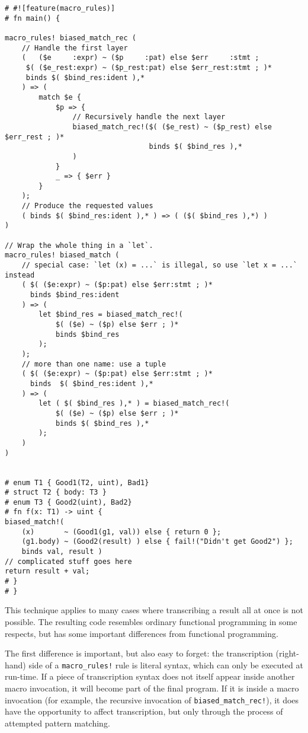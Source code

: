 \documentclass[]{article}
\begin{document}
\begin{verbatim}
# #![feature(macro_rules)]
# fn main() {

macro_rules! biased_match_rec (
    // Handle the first layer
    (   ($e     :expr) ~ ($p     :pat) else $err     :stmt ;
     $( ($e_rest:expr) ~ ($p_rest:pat) else $err_rest:stmt ; )*
     binds $( $bind_res:ident ),*
    ) => (
        match $e {
            $p => {
                // Recursively handle the next layer
                biased_match_rec!($( ($e_rest) ~ ($p_rest) else $err_rest ; )*
                                  binds $( $bind_res ),*
                )
            }
            _ => { $err }
        }
    );
    // Produce the requested values
    ( binds $( $bind_res:ident ),* ) => ( ($( $bind_res ),*) )
)

// Wrap the whole thing in a `let`.
macro_rules! biased_match (
    // special case: `let (x) = ...` is illegal, so use `let x = ...` instead
    ( $( ($e:expr) ~ ($p:pat) else $err:stmt ; )*
      binds $bind_res:ident
    ) => (
        let $bind_res = biased_match_rec!(
            $( ($e) ~ ($p) else $err ; )*
            binds $bind_res
        );
    );
    // more than one name: use a tuple
    ( $( ($e:expr) ~ ($p:pat) else $err:stmt ; )*
      binds  $( $bind_res:ident ),*
    ) => (
        let ( $( $bind_res ),* ) = biased_match_rec!(
            $( ($e) ~ ($p) else $err ; )*
            binds $( $bind_res ),*
        );
    )
)


# enum T1 { Good1(T2, uint), Bad1}
# struct T2 { body: T3 }
# enum T3 { Good2(uint), Bad2}
# fn f(x: T1) -> uint {
biased_match!(
    (x)       ~ (Good1(g1, val)) else { return 0 };
    (g1.body) ~ (Good2(result) ) else { fail!("Didn't get Good2") };
    binds val, result )
// complicated stuff goes here
return result + val;
# }
# }
\end{verbatim}

This technique applies to many cases where transcribing a result all at
once is not possible. The resulting code resembles ordinary functional
programming in some respects, but has some important differences from
functional programming.

The first difference is important, but also easy to forget: the
transcription (right-hand) side of a \texttt{macro\_rules!} rule is
literal syntax, which can only be executed at run-time. If a piece of
transcription syntax does not itself appear inside another macro
invocation, it will become part of the final program. If it is inside a
macro invocation (for example, the recursive invocation of
\texttt{biased\_match\_rec!}), it does have the opportunity to affect
transcription, but only through the process of attempted pattern
matching.
\end{document}
